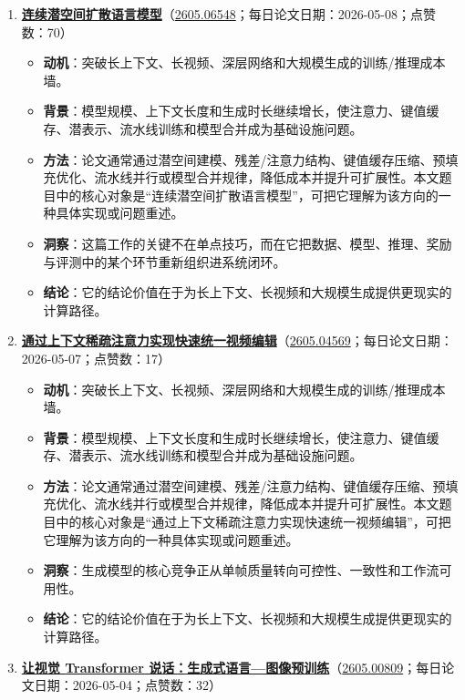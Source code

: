 \begin{enumerate}[leftmargin=1.5em]
\begin{itemize}[leftmargin=1.5em]
  \end{itemize}
  \item \textbf{\href{https://huggingface.co/papers/2605.06548}{连续潜空间扩散语言模型}}（\href{https://arxiv.org/abs/2605.06548}{2605.06548}；每日论文日期：2026-05-08；点赞数：70）
  \begin{itemize}[leftmargin=1.5em]
    \item \textbf{动机}：突破长上下文、长视频、深层网络和大规模生成的训练/推理成本墙。
    \item \textbf{背景}：模型规模、上下文长度和生成时长继续增长，使注意力、键值缓存、潜表示、流水线训练和模型合并成为基础设施问题。
    \item \textbf{方法}：论文通常通过潜空间建模、残差/注意力结构、键值缓存压缩、预填充优化、流水线并行或模型合并规律，降低成本并提升可扩展性。本文题目中的核心对象是“连续潜空间扩散语言模型”，可把它理解为该方向的一种具体实现或问题重述。
    \item \textbf{洞察}：这篇工作的关键不在单点技巧，而在它把数据、模型、推理、奖励与评测中的某个环节重新组织进系统闭环。
    \item \textbf{结论}：它的结论价值在于为长上下文、长视频和大规模生成提供更现实的计算路径。
  \end{itemize}
  \item \textbf{\href{https://huggingface.co/papers/2605.04569}{通过上下文稀疏注意力实现快速统一视频编辑}}（\href{https://arxiv.org/abs/2605.04569}{2605.04569}；每日论文日期：2026-05-07；点赞数：17）
  \begin{itemize}[leftmargin=1.5em]
    \item \textbf{动机}：突破长上下文、长视频、深层网络和大规模生成的训练/推理成本墙。
    \item \textbf{背景}：模型规模、上下文长度和生成时长继续增长，使注意力、键值缓存、潜表示、流水线训练和模型合并成为基础设施问题。
    \item \textbf{方法}：论文通常通过潜空间建模、残差/注意力结构、键值缓存压缩、预填充优化、流水线并行或模型合并规律，降低成本并提升可扩展性。本文题目中的核心对象是“通过上下文稀疏注意力实现快速统一视频编辑”，可把它理解为该方向的一种具体实现或问题重述。
    \item \textbf{洞察}：生成模型的核心竞争正从单帧质量转向可控性、一致性和工作流可用性。
    \item \textbf{结论}：它的结论价值在于为长上下文、长视频和大规模生成提供更现实的计算路径。
  \end{itemize}
  \item \textbf{\href{https://huggingface.co/papers/2605.00809}{让视觉 Transformer 说话：生成式语言—图像预训练}}（\href{https://arxiv.org/abs/2605.00809}{2605.00809}；每日论文日期：2026-05-04；点赞数：32）

\end{enumerate}
